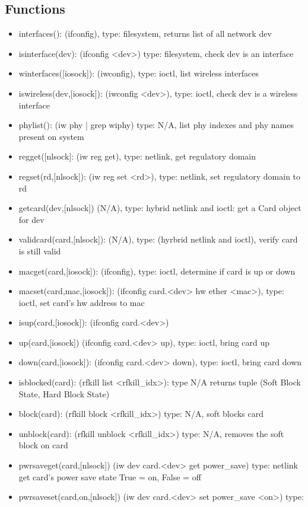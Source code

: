 \documentclass[11pt]{article}
\begin{document}
\begin{appendices}
\subsection{Functions}
\begin{itemize}
\item interfaces(): (ifconfig), type: filesystem, returns list of all network dev
\item isinterface(dev): (ifconfig <dev>) type: filesystem, check dev is an interface
\item winterfaces([iosock]): (iwconfig), type: ioctl, list wireless interfaces
\item iswireless(dev,[iosock]): (iwconfig <dev>), type: ioctl, check dev is a 
wireless interface
\item phylist(): (iw phy | grep wiphy) type: N/A, list phy indexes and phy names 
present on system
\item regget([nlsock]: (iw reg get), type: netlink, get regulatory domain
\item regset(rd,[nlsock]): (iw reg set <rd>), type: netlink, set regulatory domain 
to rd
\item getcard(dev,[nlsock]) (N/A), type: hybrid netlink and ioctl: get a Card 
object for dev
\item validcard(card,[nlsock]): (N/A), type: (hyrbrid netlink and ioctl), verify
card is still valid
\item macget(card,[iosock]): (ifconfig), type: ioctl, determine if card is up
or down
\item macset(card,mac,[iosock]): (ifconfig card.<dev> hw ether <mac>), type: 
ioctl, set card's hw address to mac
\item isup(card,[iosock]): (ifconfig card.<dev>) 
\item up(card,[iosock]) (ifconfig card.<dev> up), type: ioctl, bring card up
\item down(card,[iosock]): (ifconfig card.<dev> down), type: ioctl, bring card 
down
\item isblocked(card): (rfkill list <rfkill\_idx>): type N/A returns tuple 
(Soft Block State, Hard Block State) 
\item block(card): (rfkill block <rfkill\_idx>) type: N/A, soft blocks card
\item unblock(card): (rfkill unblock <rfkill\_idx>) type: N/A, removes the soft 
block on card
\item pwrsaveget(card,[nlsock]) (iw dev card.<dev> get power\_save) type: netlink
get card's power save state True = on, False = off
\item pwrsaveset(card,on,[nlsock]) (iw dev card.<dev> set power\_save <on>) type:

\end{itemize}
\end{appendices}
\end{document}
